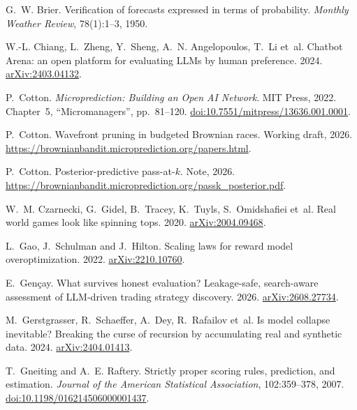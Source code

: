 \documentclass[11pt]{article}
\theoremstyle{definition}
\theoremstyle{remark}
\begin{document}
\begin{thebibliography}{}
G.~W. Brier. Verification of forecasts expressed in terms of probability. \emph{Monthly Weather
Review}, 78(1):1--3, 1950.

W.-L. Chiang, L.~Zheng, Y.~Sheng, A.~N. Angelopoulos, T.~Li et~al. Chatbot Arena: an open
platform for evaluating LLMs by human preference. 2024.
\href{https://arxiv.org/abs/2403.04132}{arXiv:2403.04132}.

P.~Cotton. \emph{Microprediction: Building an Open AI Network}. MIT Press, 2022. Chapter~5,
``Micromanagers'', pp.~81--120.
\href{https://doi.org/10.7551/mitpress/13636.001.0001}{doi:10.7551/mitpress/13636.001.0001}.

P.~Cotton. Wavefront pruning in budgeted Brownian races. Working draft, 2026.
\url{https://brownianbandit.microprediction.org/papers.html}.

P.~Cotton. Posterior-predictive pass-at-$k$. Note, 2026.
\url{https://brownianbandit.microprediction.org/passk_posterior.pdf}.

W.~M. Czarnecki, G.~Gidel, B.~Tracey, K.~Tuyls, S.~Omidshafiei et~al. Real world games look
like spinning tops. 2020. \href{https://arxiv.org/abs/2004.09468}{arXiv:2004.09468}.

L.~Gao, J.~Schulman and J.~Hilton. Scaling laws for reward model overoptimization. 2022.
\href{https://arxiv.org/abs/2210.10760}{arXiv:2210.10760}.

E.~Gen\c{c}ay. What survives honest evaluation? Leakage-safe, search-aware assessment of
LLM-driven trading strategy discovery. 2026.
\href{https://arxiv.org/abs/2608.27734}{arXiv:2608.27734}.

M.~Gerstgrasser, R.~Schaeffer, A.~Dey, R.~Rafailov et~al. Is model collapse inevitable?
Breaking the curse of recursion by accumulating real and synthetic data. 2024.
\href{https://arxiv.org/abs/2404.01413}{arXiv:2404.01413}.

T.~Gneiting and A.~E. Raftery. Strictly proper scoring rules, prediction, and estimation.
\emph{Journal of the American Statistical Association}, 102:359--378, 2007.
\href{https://doi.org/10.1198/016214506000001437}{doi:10.1198/016214506000001437}.


\end{thebibliography}
\end{document}
